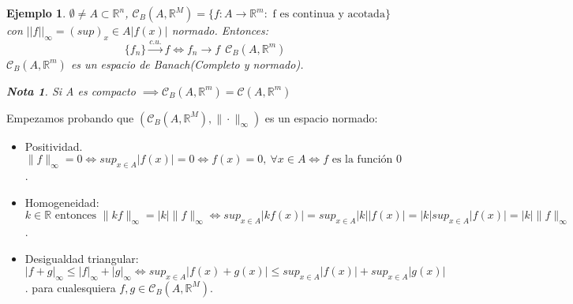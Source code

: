 \documentclass[11pt, a4paper, titlepage]{article}
\makeatletter
\renewenvironment{proof}[1][\proofname] {\vspace{-15pt}\par\pushQED{\qed}\normalfont\topsep6\p@\@plus6\p@\relax\trivlist\item[\hskip\labelsep\it#1\@addpunct{.}]\ignorespaces}{\popQED\endtrivlist\@endpefalse}
\newcommand{\R}{\mathbb{R}}
\theoremstyle{theorem-style}
\theoremstyle{definition-style}
\theoremstyle{remark-style}
\newtheorem*{nota}{Nota}
\theoremstyle{example-style}
\newtheorem*{ejemplo}{Ejemplo}
\makeatother
\begin{document}
\begin{ejemplo}
	$\emptyset \ne A \subset \R^n$, $\mathcal{C}_B(A,\R^M) = \{f:A \to \R^m : \text{ f es continua y acotada}\}$ con $||f||_\infty=(sup)_x\in A |f(x)|$ normado. Entonces:
	\[
	\{f_n\}\xrightarrow{c.u.} f \iff f_n \to f \ \ \mathcal{C}_B(A,\R^m)
	\]
$	\mathcal{C}_B(A,\R^m)$ es un espacio de Banach(Completo y normado).

\begin{nota}
	Si A es compacto $\implies \mathcal{C}_B(A,\R^m) = \mathcal{C}(A,\R^m)$
\end{nota}
\end{ejemplo}

\begin{proof}
	Empezamos probando que $(\mathcal{C}_B(A, \mathbb R^M), \|\cdot \|_\infty)$ es un espacio normado:
	\begin{itemize}
\item Positividad. $\|f\|_\infty=0 \iff sup_{x \in A}|f(x)|=0 \iff f(x)=0, \ \forall x \in A \iff f \text{ es la función } 0$.
\item Homogeneidad: $k \in \mathbb R \text{ entonces } \|kf\|_\infty=|k|\|f\|_\infty \iff sup_{x \in A}|kf(x)|=sup_{x \in A}|k||f(x)|=|k|sup_{x \in A}|f(x)| = |k| \| f\|_\infty$.
\item Desigualdad triangular:
$|f+g|_\infty \leq |f|_\infty + |g|_\infty\iff sup_{x \in A}|f(x)+g(x)| \leq sup_{x \in A}|f(x)| + sup_{x \in A}|g(x)|$.
para cualesquiera $f, g \in \mathcal{C}_B(A, \mathbb R^M)$.
\end{itemize}
\end{proof}
\end{document}
